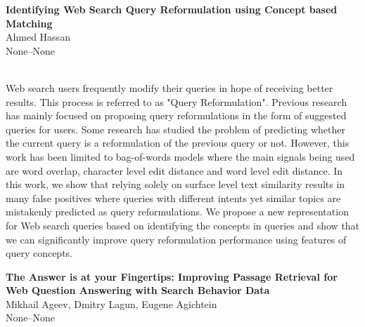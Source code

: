 \documentclass[twoside,makeidx]{book}
\renewcommand{\normalsize}{\fontsize{8}{9}\selectfont}
\renewcommand{\small}{\fontsize{7}{8}\selectfont}
\begin{document}
\par\vspace{2em}\noindent%
\begin{minipage}{\linewidth}%
\begin{center}
\textbf{\normalsize Identifying Web Search Query Reformulation using Concept based Matching}\\
\normalsize  Ahmed Hassan\\
{\small None--None}\\
\end{center}
\end{minipage}\\[0.5em]
\nopagebreak%
\noindent%
{\small Web search users frequently modify their queries in hope of receiving better results. This process is referred to as "Query Reformulation". Previous research has mainly focused on proposing query reformulations in the form of suggested queries for users. Some research has studied the problem of predicting whether the current query is a reformulation of the previous query or not. However, this work has been limited to bag-of-words models where the main signals being used are word overlap, character level edit distance and word level edit distance. In this work, we show that relying solely on surface level text similarity results in many false positives where queries with different intents yet similar topics  are mistakenly predicted as query reformulations. We propose a new representation for Web search queries based on identifying the concepts in queries and show that we can significantly improve query reformulation performance using features of query concepts.}
\par\vspace{2em}\noindent%
\begin{minipage}{\linewidth}%
\begin{center}
\textbf{\normalsize The Answer is at your Fingertips: Improving Passage Retrieval for Web Question Answering with Search Behavior Data}\\
\normalsize  Mikhail Ageev,  Dmitry Lagun,  Eugene Agichtein\\
{\small None--None}\\
\end{center}
\end{minipage}\\[0.5em]
\nopagebreak%
\noindent%
\end{document}
